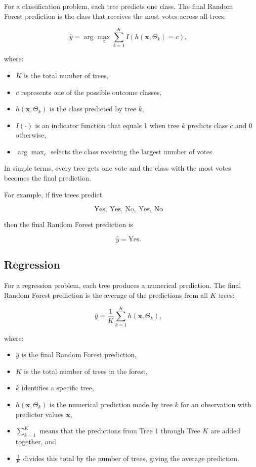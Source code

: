 \documentclass[
  letterpaper,
  DIV=11,
  numbers=noendperiod]{scrreprt}
\providecommand{\tightlist}{%
  \setlength{\itemsep}{0pt}\setlength{\parskip}{0pt}}
\begin{document}
For a classification problem, each tree predicts one class. The final
Random Forest prediction is the class that receives the most votes
across all trees:

\[
\hat{y}
=
\arg\max_c
\sum_{k=1}^{K}
I\left(h(\mathbf{x},\Theta_k)=c\right),
\]

where:

\begin{itemize}
\tightlist
\item
  \(K\) is the total number of trees,
\item
  \(c\) represents one of the possible outcome classes,
\item
  \(h(\mathbf{x},\Theta_k)\) is the class predicted by tree \(k\),
\item
  \(I(\cdot)\) is an indicator function that equals 1 when tree \(k\)
  predicts class \(c\) and 0 otherwise,
\item
  \(\arg\max_c\) selects the class receiving the largest number of
  votes.
\end{itemize}

In simple terms, every tree gets one vote and the class with the most
votes becomes the final prediction.

For example, if five trees predict

\[
\text{Yes},\ \text{Yes},\ \text{No},\ \text{Yes},\ \text{No}
\]

then the final Random Forest prediction is

\[
\hat{y} = \text{Yes}.
\]

\subsection{Regression}\label{regression}

For a regression problem, each tree produces a numerical prediction. The
final Random Forest prediction is the average of the predictions from
all \(K\) trees:

\[
\hat{y}
=
\frac{1}{K}
\sum_{k=1}^{K}
h(\mathbf{x},\Theta_k),
\]

where:

\begin{itemize}
\tightlist
\item
  \(\hat{y}\) is the final Random Forest prediction,
\item
  \(K\) is the total number of trees in the forest,
\item
  \(k\) identifies a specific tree,
\item
  \(h(\mathbf{x},\Theta_k)\) is the numerical prediction made by tree
  \(k\) for an observation with predictor values \(\mathbf{x}\),
\item
  \(\sum_{k=1}^{K}\) means that the predictions from Tree 1 through Tree
  \(K\) are added together, and
\item
  \(\frac{1}{K}\) divides this total by the number of trees, giving the
  average prediction.
\end{itemize}
\end{document}
